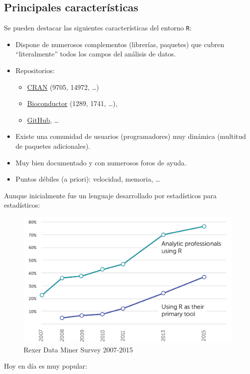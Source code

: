 \documentclass[]{book}
\begin{document}
\hypertarget{principales-caracteristicas}{%
\subsection{Principales características}\label{principales-caracteristicas}}

Se pueden destacar las siguientes características del entorno \texttt{R}:

\begin{itemize}
\item
  Dispone de numerosos complementos (librerías, paquetes) que cubren ``literalmente''
  todos los campos del análisis de datos.
\item
  Repositorios:

  \begin{itemize}
  \item
    \href{https://cran.r-project.org}{CRAN} (9705, 14972, \ldots{})
  \item
    \href{https://www.bioconductor.org}{Bioconductor} (1289, 1741, \ldots{}),
  \item
    \href{https://github.com/trending/r?since=monthly}{GitHub}, \ldots{}
  \end{itemize}
\item
  Existe una comunidad de usuarios (programadores) muy dinámica
  (multitud de paquetes adicionales).
\item
  Muy bien documentado y con numerosos foros de ayuda.
\item
  Puntos débiles (a priori): velocidad, memoria, \ldots{}
\end{itemize}

Aunque inicialmente fue un lenguaje desarrollado por estadísticos
para estadísticos:

\begin{figure}[!htb]

{\centering \includegraphics[width=0.4\linewidth]{figuras/rexer2016} 

}

\caption{Rexer Data Miner Survey 2007-2015}\label{fig:rexer}
\end{figure}

Hoy en día es muy popular:
\end{document}

